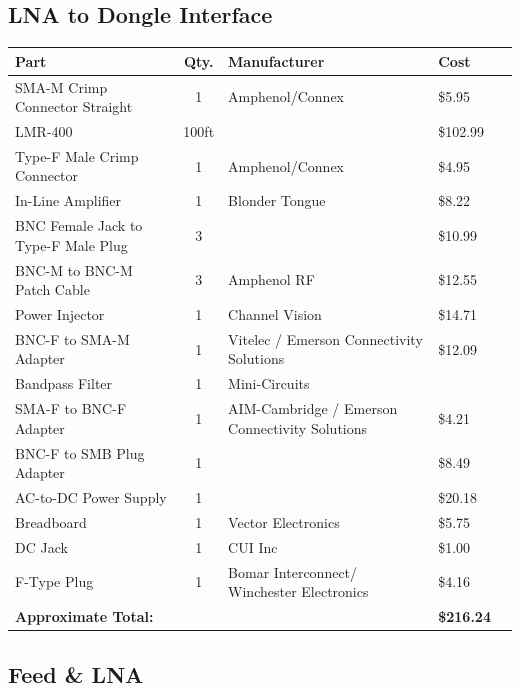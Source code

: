 \documentclass[11pt]{article} %
\begin{document}
\subsection{LNA to Dongle Interface}


\begin{tabular}{| p{6cm} | c | p{5cm} | l | c |}
\hline
\textbf{Part} & \textbf{Qty.} & \textbf{Manufacturer} & \textbf{Cost} \\ \hline \hline
SMA-M Crimp Connector Straight & 1 & Amphenol/Connex & \$5.95 \\ \hline
LMR-400 & 100ft & & \$102.99\\ \hline
Type-F Male Crimp Connector & 1 & Amphenol/Connex &\$4.95 \\ \hline
In-Line Amplifier & 1 & Blonder Tongue & \$8.22 \\ \hline
BNC Female Jack to Type-F Male Plug & 3 & & \$10.99 \\ \hline
BNC-M to BNC-M Patch Cable & 3 & Amphenol RF & \$12.55 \\ \hline
Power Injector & 1 & Channel Vision & \$14.71 \\ \hline
BNC-F to SMA-M Adapter & 1 & Vitelec / Emerson Connectivity Solutions & \$12.09 \\ \hline
Bandpass Filter & 1 & Mini-Circuits & \\ \hline
SMA-F to BNC-F Adapter & 1 & AIM-Cambridge / Emerson Connectivity Solutions & \$4.21 \\ \hline
BNC-F to SMB Plug Adapter & 1 & & \$8.49 \\ \hline
AC-to-DC Power Supply & 1 & & \$20.18 \\ \hline
Breadboard & 1 & Vector Electronics & \$5.75 \\ \hline
DC Jack & 1 & CUI Inc & \$1.00 \\ \hline
F-Type Plug & 1 & Bomar Interconnect/ Winchester Electronics & \$4.16\\ \hline
\textbf{Approximate Total:} & & & \textbf{\$216.24} \\ \hline
\end{tabular}

\subsection{Feed \& LNA}
\end{document}
